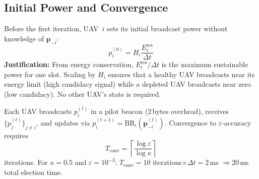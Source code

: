 \documentclass[journal]{IEEEtran}
\begin{document}
\subsection{Initial Power and Convergence}\label{sec:init}

Before the first iteration, UAV~$i$ sets its initial
broadcast power without knowledge of $\mathbf{p}_{-i}$:
\begin{equation}\label{eq:p0}
  p_{i}^{(0)}=H_{i}\frac{E_{i}^{\mathrm{res}}}{\Delta t}
\end{equation}
\textbf{Justification:} From energy conservation,
$E_{i}^{\mathrm{res}}/\Delta t$ is the maximum sustainable
power for one slot.  Scaling by $H_{i}$ ensures that a
healthy UAV broadcasts near its energy limit (high candidacy
signal) while a depleted UAV broadcasts near zero
(low candidacy).  No other UAV's state is required.

Each UAV broadcasts $p_{i}^{(t)}$ in a pilot beacon
(2\,bytes overhead), receives $\{p_{j}^{(t)}\}_{j\neq i}$,
and updates via
$p_{i}^{(t+1)}=\mathrm{BR}_{i}(\mathbf{p}_{-i}^{(t)})$.
Convergence to $\varepsilon$-accuracy requires
\begin{equation}
\label{eq:Tconv}
  T_{\mathrm{conv}}
  =\left\lceil\frac{\log\varepsilon}{\log\kappa}\right\rceil
\end{equation}
iterations.  For $\kappa=0.5$ and $\varepsilon=10^{-3}$:
$T_{\mathrm{conv}}=10$ iterations$\times\Delta t=2$\,ms
$\Rightarrow20$\,ms total election time.
\end{document}
